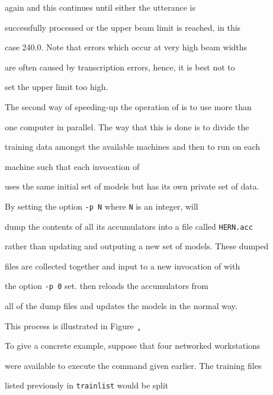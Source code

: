 again and this continues until either the utterance is 


successfully processed or the upper beam limit is reached, in this


case 240.0.  Note that errors which occur at very high beam widths


are often caused by transcription errors, hence, it is best not to


set the upper limit too high.












The second way of speeding-up the operation of  is to use more than


one computer in parallel.  The way that this is done is to divide the


training data amongst the available machines and then to run  on each


machine such that each invocation of  


uses the same initial set of models but has its own private set of data.


By setting the option {\tt -p N} where {\tt N} is an integer,  will


dump the contents of all its accumulators  into a file called {\tt HERN.acc}


rather than updating and outputing a new set of models.  These dumped


files are collected together and input to a new invocation of  with


the option {\tt -p 0} set.   then reloads the accumulators from


all of the dump files and updates the models in the normal way.


This process is illustrated in Figure~\href{f:parher}.





To give a concrete example, suppose that four networked workstations


were available to execute the  command given earlier. The training files 


listed previously in \texttt{trainlist} would be split 


